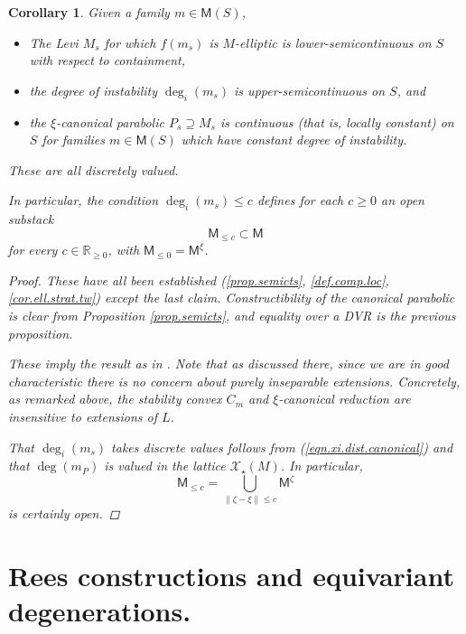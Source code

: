 \documentclass[openany]{amsbook}
\newtheorem{corollary}[theorem]{Corollary}
\theoremstyle{definition}
\theoremstyle{remark}
\numberwithin{equation}{section}
\newcommand{\R}{\mathbb{R}}
\newcommand{\cX}{\mathcal{X}}
\renewcommand{\-}{\operatorname{-}}
\newcommand{\on}[1]{\operatorname{#1}}
\newcommand{\bM}{\mathsf{M}}
\begin{document}
\begin{corollary}\label{cor.semicts.invars}
    Given a family $m \in \bM(S)$,
    \begin{itemize}
        \item The Levi $M_s$ for which $f(m_s)$ is $M$-elliptic is lower-semicontinuous on $S$ with respect to containment,
        \item the degree of instability $\deg_i(m_s)$ is upper-semicontinuous on $S$, and
        \item the $\xi$-canonical parabolic $P_s \supseteq M_s$ is continuous (that is, locally constant) on $S$ for families $m \in \bM(S)$ which have constant degree of instability.
    \end{itemize}
    These are all discretely valued. 

    In particular, the condition $\deg_i(m_s) \le c$ defines for each $c \ge 0$ an open substack
    $$
        \bM_{\le c} \subset \bM
    $$
for every $c \in \R_{\ge 0}$, with $\bM_{\le 0} = \bM^{\xi}$. 
    \begin{proof}
    These have all been established (\ref{prop.semicts}, \ref{def.comp.loc}, \ref{cor.ell.strat.tw}) except the last claim. Constructibility of the canonical parabolic is clear from Proposition \ref{prop.semicts}, and equality over a DVR is the previous proposition. 

    These imply the result as in \cite[Theorem 7.2.5]{behrendthesis}. Note that as discussed there, since we are in good characteristic there is no concern about purely inseparable extensions. Concretely, as remarked above, the stability convex $C_m$ and $\xi$-canonical reduction are insensitive to extensions of $L$.

    That $\deg_i(m_s)$ takes discrete values follows from (\ref{eqn.xi.dist.canonical}) and that $\deg(m_P)$ is valued in the lattice $\cX_\star(M)$. In particular, 
    $$
        \bM_{\le c} = \bigcup_{\|\zeta - \xi\| \le c} \bM^{\zeta}
    $$
    is certainly open.
    \end{proof}
\end{corollary}

\section{Rees constructions and equivariant degenerations.}

\newcommand{\cZ}{\mathcal{Z}}
\newcommand{\Filt}{\on{Filt}}
\newcommand{\ev}{\on{ev}}
\newcommand{\gr}{\on{gr}}
\end{document}
